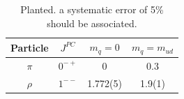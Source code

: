 \begin{table}
\begin{tabular}{|c|c|c|c|}
\hline Particle &$J^{PC}$&$m_q = 0$ & $m_q=m_{ud}$ \\
\hline $\pi$ & $0^{-+}$ & 0 & 0.3 \\
\hline $\rho$ & $1^{--}$ & 1.772(5) & 1.9(1) \\
\end{tabular}
\caption{Planted. a systematic error
of 5\% should be associated.}\label{tab:largeNsummary}
\end{table}
